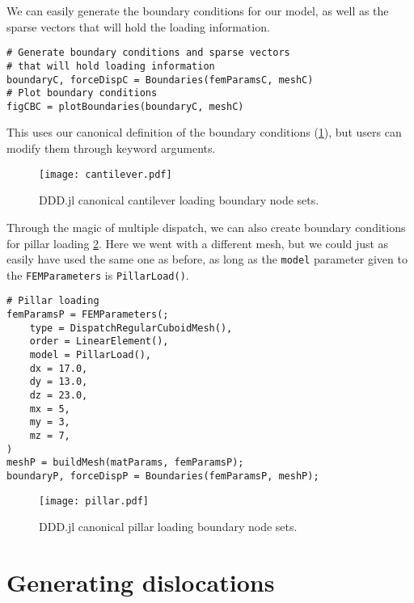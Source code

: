 We can easily generate the boundary conditions for our model, as well as the sparse vectors that will hold the loading information.
\begin{verbatim}
# Generate boundary conditions and sparse vectors 
# that will hold loading information
boundaryC, forceDispC = Boundaries(femParamsC, meshC)
# Plot boundary conditions
figCBC = plotBoundaries(boundaryC, meshC)
\end{verbatim}
This uses our canonical definition of the boundary conditions (\cref{f:cantileverNodeSet}), but users can modify them through keyword arguments.
\begin{figure}
    \centering
    \texttt{[image: cantilever.pdf]}
    \caption{DDD.jl canonical cantilever loading boundary node sets.}
    \label{f:cantileverNodeSet}
\end{figure}
Through the magic of multiple dispatch, we can also create boundary conditions for pillar loading \cref{f:pillarLoad}. Here we went with a different mesh, but we could just as easily have used the same one as before, as long as the \texttt{model} parameter given to the \texttt{FEMParameters} is \texttt{PillarLoad()}.
\begin{verbatim}
# Pillar loading
femParamsP = FEMParameters(;
    type = DispatchRegularCuboidMesh(),
    order = LinearElement(),
    model = PillarLoad(),
    dx = 17.0,
    dy = 13.0,
    dz = 23.0,
    mx = 5,
    my = 3,
    mz = 7,
)
meshP = buildMesh(matParams, femParamsP);
boundaryP, forceDispP = Boundaries(femParamsP, meshP);
\end{verbatim}
\begin{figure}
    \centering
    \texttt{[image: pillar.pdf]}
    \caption{DDD.jl canonical pillar loading boundary node sets.}
    \label{f:pillarLoad}
\end{figure}

\section{Generating dislocations}

